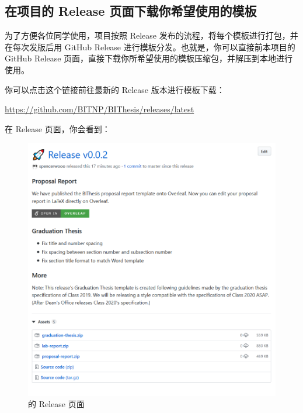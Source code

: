 \subsection{在项目的 Release 页面下载你希望使用的模板}
为了方便各位同学使用，项目按照 Release 发布的流程，将每个模板进行打包，并在每次发版后用 GitHub Release 进行模板分发。也就是，你可以直接前本项目的 GitHub Release 页面，直接下载你所希望使用的模板压缩包，并解压到本地进行使用。

你可以点击这个链接前往最新的 Release 版本进行模板下载：

\begin{center}
  \color{ForestGreen}\href{https://github.com/BITNP/BIThesis/releases/latest}{https://github.com/BITNP/BIThesis/releases/latest}
\end{center}

在 Release 页面，你会看到：


\begin{figure}[H]
  \centering
  \includegraphics[width=\textwidth]{images/release.png}
  \caption{{\BIThesis} 的 Release 页面}
\end{figure}


